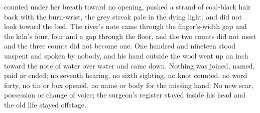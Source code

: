 \documentclass{design/chronicle}
\begin{document}
{\begin{itemize}[leftmargin=1.4em,itemsep=1pt,topsep=3pt,parsep=0pt]
counted under her breath toward no opening, pushed a strand of coal-black hair back with the burn-wrist, the grey streak pale in the dying light, and did not look toward the bed. The river’s note came through the finger’s-width gap and the kiln’s four, four and a gap through the floor, and the two counts did not meet and the three counts did not become one. One hundred and nineteen stood unspent and spoken by nobody, and his hand outside the wool went up an inch toward the note of water over water and came down. Nothing was joined, named, paid or ended; no seventh hearing, no sixth sighting, no knot counted, no word forty, no tin or box opened, no name or body for the missing hand. No new scar, possession or change of voice; the surgeon’s register stayed inside his head and the old life stayed offstage.

\end{itemize}

\begin{itemize}[leftmargin=1.4em,itemsep=1pt,topsep=3pt,parsep=0pt]


\end{itemize}}
\end{document}
